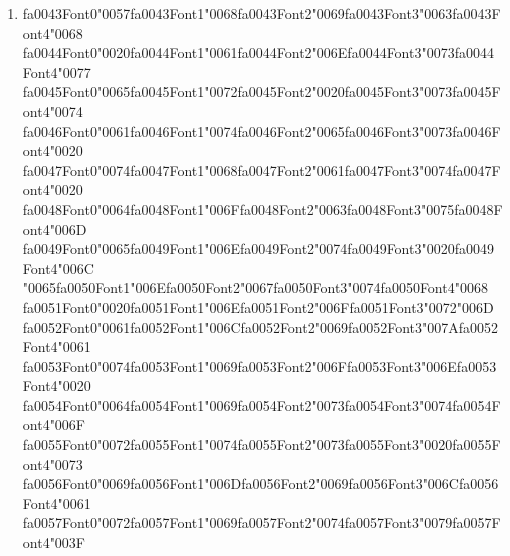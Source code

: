 \documentclass[12pt]{article}
\begin{document}
\begin{enumerate}[label=Q\arabic*.]
 \item {\csname fa0043Font0\endcsname\char"0057}{\csname fa0043Font1\endcsname\char"0068}{\csname fa0043Font2\endcsname\char"0069}{\csname fa0043Font3\endcsname\char"0063}{\csname fa0043Font4\endcsname\char"0068} {\csname fa0044Font0\endcsname\char"0020}{\csname fa0044Font1\endcsname\char"0061}{\csname fa0044Font2\endcsname\char"006E}{\csname fa0044Font3\endcsname\char"0073}{\csname fa0044Font4\endcsname\char"0077} {\csname fa0045Font0\endcsname\char"0065}{\csname fa0045Font1\endcsname\char"0072}{\csname fa0045Font2\endcsname\char"0020}{\csname fa0045Font3\endcsname\char"0073}{\csname fa0045Font4\endcsname\char"0074} {\csname fa0046Font0\endcsname\char"0061}{\csname fa0046Font1\endcsname\char"0074}{\csname fa0046Font2\endcsname\char"0065}{\csname fa0046Font3\endcsname\char"0073}{\csname fa0046Font4\endcsname\char"0020} {\csname fa0047Font0\endcsname\char"0074}{\csname fa0047Font1\endcsname\char"0068}{\csname fa0047Font2\endcsname\char"0061}{\csname fa0047Font3\endcsname\char"0074}{\csname fa0047Font4\endcsname\char"0020} {\csname fa0048Font0\endcsname\char"0064}{\csname fa0048Font1\endcsname\char"006F}{\csname fa0048Font2\endcsname\char"0063}{\csname fa0048Font3\endcsname\char"0075}{\csname fa0048Font4\endcsname\char"006D} {\csname fa0049Font0\endcsname\char"0065}{\csname fa0049Font1\endcsname\char"006E}{\csname fa0049Font2\endcsname\char"0074}{\csname fa0049Font3\endcsname\char"0020}{\csname fa0049Font4\endcsname\char"006C} {\char"0065}{\csname fa0050Font1\endcsname\char"006E}{\csname fa0050Font2\endcsname\char"0067}{\csname fa0050Font3\endcsname\char"0074}{\csname fa0050Font4\endcsname\char"0068} {\csname fa0051Font0\endcsname\char"0020}{\csname fa0051Font1\endcsname\char"006E}{\csname fa0051Font2\endcsname\char"006F}{\csname fa0051Font3\endcsname\char"0072}{\char"006D} {\csname fa0052Font0\endcsname\char"0061}{\csname fa0052Font1\endcsname\char"006C}{\csname fa0052Font2\endcsname\char"0069}{\csname fa0052Font3\endcsname\char"007A}{\csname fa0052Font4\endcsname\char"0061} {\csname fa0053Font0\endcsname\char"0074}{\csname fa0053Font1\endcsname\char"0069}{\csname fa0053Font2\endcsname\char"006F}{\csname fa0053Font3\endcsname\char"006E}{\csname fa0053Font4\endcsname\char"0020} {\csname fa0054Font0\endcsname\char"0064}{\csname fa0054Font1\endcsname\char"0069}{\csname fa0054Font2\endcsname\char"0073}{\csname fa0054Font3\endcsname\char"0074}{\csname fa0054Font4\endcsname\char"006F} {\csname fa0055Font0\endcsname\char"0072}{\csname fa0055Font1\endcsname\char"0074}{\csname fa0055Font2\endcsname\char"0073}{\csname fa0055Font3\endcsname\char"0020}{\csname fa0055Font4\endcsname\char"0073} {\csname fa0056Font0\endcsname\char"0069}{\csname fa0056Font1\endcsname\char"006D}{\csname fa0056Font2\endcsname\char"0069}{\csname fa0056Font3\endcsname\char"006C}{\csname fa0056Font4\endcsname\char"0061} {\csname fa0057Font0\endcsname\char"0072}{\csname fa0057Font1\endcsname\char"0069}{\csname fa0057Font2\endcsname\char"0074}{\csname fa0057Font3\endcsname\char"0079}{\csname fa0057Font4\endcsname\char"003F}

\end{enumerate}
\end{document}
